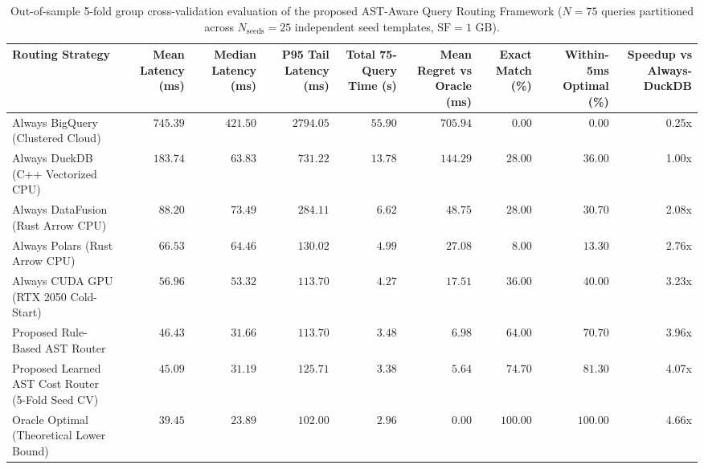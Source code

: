 \begin{table}[htbp]
\centering
\scriptsize
\setlength{\tabcolsep}{3.8pt}
\caption{Out-of-sample 5-fold group cross-validation evaluation of the proposed AST-Aware Query Routing Framework ($N=75$ queries partitioned across $N_{\text{seeds}}=25$ independent seed templates, $\text{SF}=1$ GB).}
\label{tab:router_evaluation}
\begin{tabular}{@{}lrrrrrrrr@{}}
\toprule
\textbf{Routing Strategy} & \textbf{Mean Latency (ms)} & \textbf{Median Latency (ms)} & \textbf{P95 Tail Latency (ms)} & \textbf{Total 75-Query Time (s)} & \textbf{Mean Regret vs Oracle (ms)} & \textbf{Exact Match (\%)} & \textbf{Within-5ms Optimal (\%)} & \textbf{Speedup vs Always-DuckDB} \\
\midrule
Always BigQuery (Clustered Cloud) & $745.39$ & $421.50$ & $2794.05$ & $55.90$ & $705.94$ & $0.00$ & $0.00$ & 0.25x \\
Always DuckDB (C++ Vectorized CPU) & $183.74$ & $63.83$ & $731.22$ & $13.78$ & $144.29$ & $28.00$ & $36.00$ & 1.00x \\
Always DataFusion (Rust Arrow CPU) & $88.20$ & $73.49$ & $284.11$ & $6.62$ & $48.75$ & $28.00$ & $30.70$ & 2.08x \\
Always Polars (Rust Arrow CPU) & $66.53$ & $64.46$ & $130.02$ & $4.99$ & $27.08$ & $8.00$ & $13.30$ & 2.76x \\
Always CUDA GPU (RTX 2050 Cold-Start) & $56.96$ & $53.32$ & $113.70$ & $4.27$ & $17.51$ & $36.00$ & $40.00$ & 3.23x \\
Proposed Rule-Based AST Router & $46.43$ & $31.66$ & $113.70$ & $3.48$ & $6.98$ & $64.00$ & $70.70$ & 3.96x \\
Proposed Learned AST Cost Router (5-Fold Seed CV) & $45.09$ & $31.19$ & $125.71$ & $3.38$ & $5.64$ & $74.70$ & $81.30$ & 4.07x \\
Oracle Optimal (Theoretical Lower Bound) & $39.45$ & $23.89$ & $102.00$ & $2.96$ & $0.00$ & $100.00$ & $100.00$ & 4.66x \\
\bottomrule
\end{tabular}
\end{table}